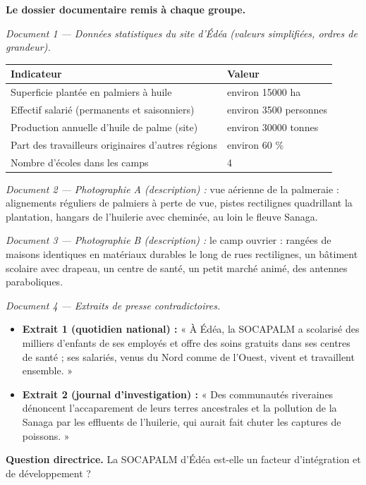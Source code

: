 \documentclass[11pt]{article}
\begin{document}
\textbf{Le dossier documentaire remis à chaque groupe.}

\emph{Document 1 — Données statistiques du site d'Édéa (valeurs simplifiées, ordres de grandeur).}

\begin{center}
\begin{tabularx}{\linewidth}{|l|X|}
\hline
\rowcolor{popblueL} \textbf{Indicateur} & \textbf{Valeur} \\
\hline
Superficie plantée en palmiers à huile & environ \num{15000} ha \\
\hline
Effectif salarié (permanents et saisonniers) & environ \num{3500} personnes \\
\hline
Production annuelle d'huile de palme (site) & environ \num{30000} tonnes \\
\hline
Part des travailleurs originaires d'autres régions & environ 60 \% \\
\hline
Nombre d'écoles dans les camps & 4 \\
\hline
\end{tabularx}
\end{center}

\emph{Document 2 — Photographie A (description) :} vue aérienne de la palmeraie : alignements réguliers de palmiers à perte de vue, pistes rectilignes quadrillant la plantation, hangars de l'huilerie avec cheminée, au loin le fleuve Sanaga.

\emph{Document 3 — Photographie B (description) :} le camp ouvrier : rangées de maisons identiques en matériaux durables le long de rues rectilignes, un bâtiment scolaire avec drapeau, un centre de santé, un petit marché animé, des antennes paraboliques.

\emph{Document 4 — Extraits de presse contradictoires.}
\begin{itemize}
\item \textbf{Extrait 1 (quotidien national) :} « À Édéa, la SOCAPALM a scolarisé des milliers d'enfants de ses employés et offre des soins gratuits dans ses centres de santé ; ses salariés, venus du Nord comme de l'Ouest, vivent et travaillent ensemble. »
\item \textbf{Extrait 2 (journal d'investigation) :} « Des communautés riveraines dénoncent l'accaparement de leurs terres ancestrales et la pollution de la Sanaga par les effluents de l'huilerie, qui aurait fait chuter les captures de poissons. »
\end{itemize}

\textbf{Question directrice.} La SOCAPALM d'Édéa est-elle un facteur d'intégration et de développement ?
\end{document}
